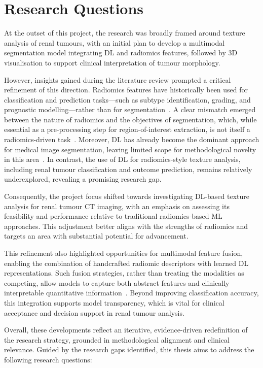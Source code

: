 \documentclass[final,british,a4paper,12pt]{phdthesis}
\begin{document}
\section{Research Questions}\label{rq}
At the outset of this project, the research was broadly framed around texture analysis of renal tumours, with an initial plan to develop a multimodal segmentation model integrating DL and radiomics features, followed by 3D visualisation to support clinical interpretation of tumour morphology. 

However, insights gained during the literature review prompted a critical refinement of this direction. Radiomics features have historically been used for classification and prediction tasks—such as subtype identification, grading, and prognostic modelling—rather than for segmentation~\cite{radiomicsIntro,radiomics1,radiomics2,radiomics3}. A clear mismatch emerged between the nature of radiomics and the objectives of segmentation, which, while essential as a pre-processing step for region-of-interest extraction, is not itself a radiomics-driven task~\cite{kits}. Moreover, DL has already become the dominant approach for medical image segmentation, leaving limited scope for methodological novelty in this area~\cite{kits, litjens2017survey}. In contrast, the use of DL for radiomics-style texture analysis, including renal tumour classification and outcome prediction, remains relatively underexplored, revealing a promising research gap.

Consequently, the project focus shifted towards investigating DL-based texture analysis for renal tumour CT imaging, with an emphasis on assessing its feasibility and performance relative to traditional radiomics-based ML approaches. This adjustment better aligns with the strengths of radiomics and targets an area with substantial potential for advancement.

This refinement also highlighted opportunities for multimodal feature fusion, enabling the combination of handcrafted radiomic descriptors with learned DL representations. Such fusion strategies, rather than treating the modalities as competing, allow models to capture both abstract features and clinically interpretable quantitative information~\cite{huang2020fusion}. Beyond improving classification accuracy, this integration supports model transparency, which is vital for clinical acceptance and decision support in renal tumour analysis.

Overall, these developments reflect an iterative, evidence-driven redefinition of the research strategy, grounded in methodological alignment and clinical relevance. Guided by the research gaps identified, this thesis aims to address the following research questions:
\end{document}

